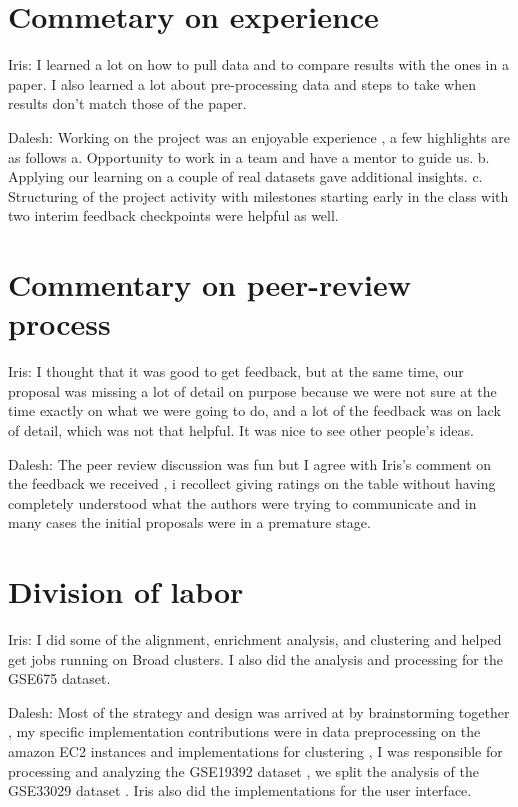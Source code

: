\documentclass[aps,prd,final,onecolumn,a4paper,10pt]{revtex4}
\begin{document}
\section{Commetary on experience}
Iris: I learned a lot on how to pull data and to compare results with the ones in a paper. I also learned a lot about pre-processing data and steps to take when results don't match those of the paper.

Dalesh: Working on the project was an enjoyable experience , a few highlights are as follows
a. Opportunity to work in a team and have a mentor to guide us.
b. Applying our learning on a couple of real datasets gave additional insights.
c. Structuring of the project activity with milestones starting early in the class with two interim feedback checkpoints were helpful as well.

\section{Commentary on peer-review process}
Iris: I thought that it was good to get feedback, but at the same time, our proposal was missing a lot of detail on purpose because we were not sure at the time exactly on what we were going to do, and a lot of the feedback was on lack of detail, which was not that helpful. It was nice to see other people's ideas.

Dalesh: The peer review discussion was fun but I agree with Iris's comment on the feedback we received , i recollect giving ratings on the table without having completely understood what the authors were trying to communicate and in many cases the initial proposals were in a premature stage.

\section{Division of labor}

Iris: I did some of the alignment, enrichment analysis, and clustering and helped get jobs running on Broad clusters. I also did the analysis and processing for the GSE675 dataset.

Dalesh: Most of the strategy and design was arrived at by brainstorming together , my specific implementation contributions were in data preprocessing on the amazon EC2 instances and implementations for clustering , I was responsible for processing and analyzing the GSE19392 dataset , we split the analysis of the GSE33029 dataset . Iris also did the implementations for the user interface.
\end{document}
